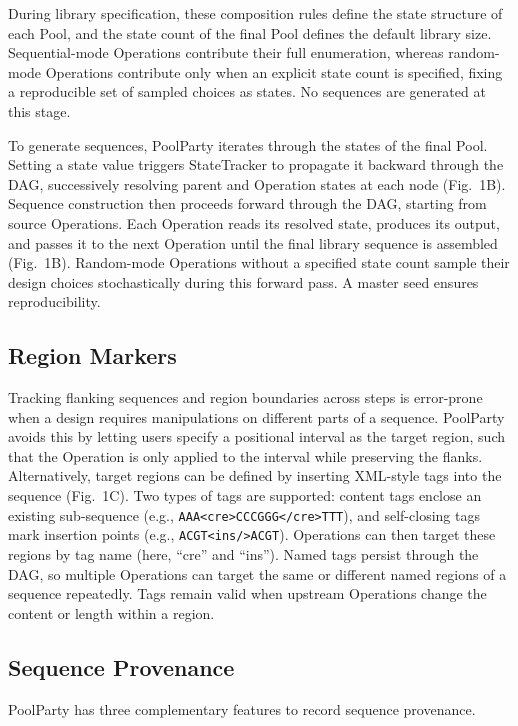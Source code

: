 \documentclass[unnumsec,webpdf,modern,large]{mam-authoring-template}%
\theoremstyle{thmstyleone}%
\theoremstyle{thmstyletwo}%
\theoremstyle{thmstylethree}%
\begin{document}
During library specification, these composition rules define the state structure of each Pool, and the state count of the final Pool defines the default library size. Sequential-mode Operations contribute their full enumeration, whereas random-mode Operations contribute only when an explicit state count is specified, fixing a reproducible set of sampled choices as states. No sequences are generated at this stage.

To generate sequences, PoolParty iterates through the states of the final Pool. Setting a state value triggers StateTracker to propagate it backward through the DAG, successively resolving parent and Operation states at each node (Fig.~1B). Sequence construction then proceeds forward through the DAG, starting from source Operations. Each Operation reads its resolved state, produces its output, and passes it to the next Operation until the final library sequence is assembled (Fig.~1B). Random-mode Operations without a specified state count sample their design choices stochastically during this forward pass. A master seed ensures reproducibility.

\subsection{Region Markers}

Tracking flanking sequences and region boundaries across steps is error-prone when a design requires manipulations on different parts of a sequence. PoolParty avoids this by letting users specify a positional interval as the target region, such that the Operation is only applied to the interval while preserving the flanks. Alternatively, target regions can be defined by inserting XML-style tags into the sequence (Fig.~1C). Two types of tags are supported: content tags enclose an existing sub-sequence (e.g., \texttt{AAA<cre>CCCGGG</cre>TTT}), and self-closing tags mark insertion points (e.g., \texttt{ACGT<ins/>ACGT}). Operations can then target these regions by tag name (here, ``cre'' and ``ins''). Named tags persist through the DAG, so multiple Operations can target the same or different named regions of a sequence repeatedly. Tags remain valid when upstream Operations change the content or length within a region.

\subsection{Sequence Provenance}

PoolParty has three complementary features to record sequence provenance.
\end{document}
